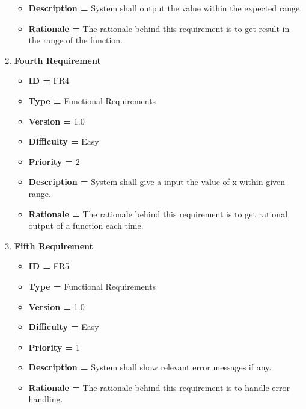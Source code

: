 \documentclass[a4paper,12pt]{article}
\begin{document}
\begin{enumerate}
\begin{itemize}
            \item \textbf{Description = }  System shall output the value within the expected range. 
            \item \textbf{Rationale = }	The rationale behind this requirement is to get result in the range of the function.
        \end{itemize}
        \item\textbf{Fourth  Requirement}
        \begin{itemize}
            \item \textbf{ID = } FR4
            \item \textbf{Type = } Functional Requirements
            \item \textbf{Version = } 1.0
            \item \textbf{Difficulty = } Easy
            \item \textbf{Priority = } 2
            \item \textbf{Description = } System shall give a input the value of x  within given range.
            \item \textbf{Rationale = }	The rationale behind this requirement is to get rational output of a function each time.
        \end{itemize}
         \item\textbf{Fifth  Requirement}
        	 \begin{itemize}
            \item \textbf{ID = } FR5
            \item \textbf{Type = } Functional Requirements
            \item \textbf{Version = } 1.0
            \item \textbf{Difficulty = } Easy
            \item \textbf{Priority = } 1
            \item \textbf{Description = } System shall show relevant error messages if any.
            \item \textbf{Rationale = }	The rationale behind this requirement is to handle error handling.
            \end{itemize}
            

\end{enumerate}
\end{document}
